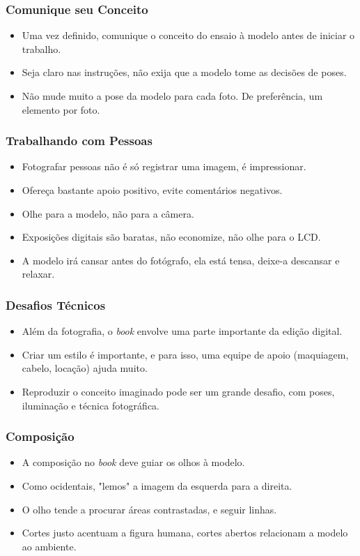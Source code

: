 \begin{frame}
  \frametitle{Comunique seu Conceito}
  \begin{itemize}
      \item Uma vez definido, comunique o conceito do ensaio à modelo antes de
      iniciar o trabalho.
      \item Seja claro nas instruções, não exija que a modelo tome as decisões de poses.
      \item Não mude muito a pose da modelo para cada foto. De preferência, um elemento por foto.
  \end{itemize}
\end{frame}

\begin{frame}
  \frametitle{Trabalhando com Pessoas}
  \begin{itemize}
      \item Fotografar pessoas não é só registrar uma imagem, é impressionar.
      \item Ofereça bastante apoio positivo, evite comentários negativos.
      \item Olhe para a modelo, não para a câmera.
      \item Exposições digitais são baratas, não economize, não olhe para o LCD.
      \item A modelo irá cansar antes do fotógrafo, ela está tensa, deixe-a descansar e relaxar.
  \end{itemize}
\end{frame}

\begin{frame}
  \frametitle{Desafios Técnicos}
  \begin{itemize}
      \item Além da fotografia, o \textit{book} envolve uma parte importante da edição digital.
      \item Criar um estilo é importante, e para isso, uma equipe de apoio (maquiagem, cabelo, locação) ajuda muito.
      \item Reproduzir o conceito imaginado pode ser um grande desafio, com poses, iluminação e técnica fotográfica.
  \end{itemize}
\end{frame}

\begin{frame}
  \frametitle{Composição}
  \begin{itemize}
      \item A composição no \textit{book} deve guiar os olhos à modelo.
      \item Como ocidentais, "lemos" a imagem da esquerda para a direita.
      \item O olho tende a procurar áreas contrastadas, e seguir linhas.
      \item Cortes justo acentuam a figura humana, cortes abertos relacionam a modelo
      ao ambiente.
  \end{itemize}
\end{frame}

